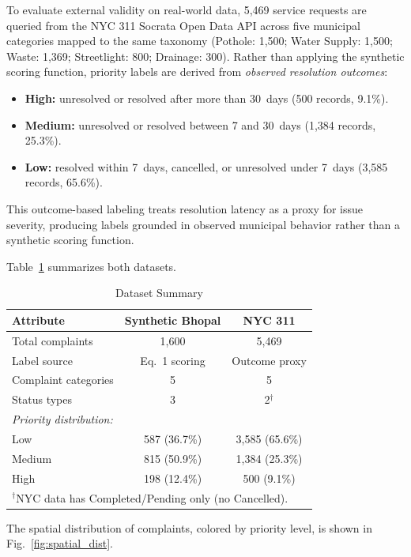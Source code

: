 \documentclass[conference]{IEEEtran}
\begin{document}
To evaluate external validity on real-world data, 5,469 service requests are queried from the NYC 311 Socrata Open Data API across five municipal categories mapped to the same taxonomy (Pothole: 1,500; Water Supply: 1,500; Waste: 1,369; Streetlight: 800; Drainage: 300). Rather than applying the synthetic scoring function, priority labels are derived from \textit{observed resolution outcomes}:

\begin{itemize}
    \item \textbf{High:} unresolved or resolved after more than 30~days (500 records, 9.1\%).
    \item \textbf{Medium:} unresolved or resolved between 7 and 30~days (1,384 records, 25.3\%).
    \item \textbf{Low:} resolved within 7~days, cancelled, or unresolved under 7~days (3,585 records, 65.6\%).
\end{itemize}

This outcome-based labeling treats resolution latency as a proxy for issue severity, producing labels grounded in observed municipal behavior rather than a synthetic scoring function.

Table~\ref{tab:dataset} summarizes both datasets.

\begin{table}[h]
\centering
\caption{Dataset Summary}
\label{tab:dataset}
\begin{tabular}{lcc}
\toprule
Attribute & Synthetic Bhopal & NYC 311 \\
\midrule
Total complaints & 1,600 & 5,469 \\
Label source & Eq.~1 scoring & Outcome proxy \\
Complaint categories & 5 & 5 \\
Status types & 3 & 2$^{\dagger}$ \\
\midrule
\textit{Priority distribution:} & & \\
\quad Low & 587 (36.7\%) & 3,585 (65.6\%) \\
\quad Medium & 815 (50.9\%) & 1,384 (25.3\%) \\
\quad High & 198 (12.4\%) & 500 (9.1\%) \\
\bottomrule
\multicolumn{3}{l}{\scriptsize $^{\dagger}$NYC data has Completed/Pending only (no Cancelled).}
\end{tabular}
\end{table}

The spatial distribution of complaints, colored by priority level, is shown in Fig.~\ref{fig:spatial_dist}.
\end{document}
